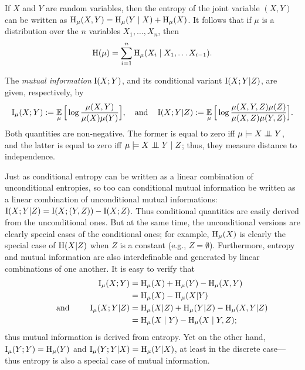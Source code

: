 \begin{fact}\label{fact:entropy-chain-rule}
    If $X$ and $Y$ are random variables, then the entropy of the joint
   variable $(X,Y)$ can be written as $\operatorname{\mathrm{H}}_\mu(X,Y) = 
\operatorname{\mathrm{H}}_\mu( Y \mid X) + \operatorname{\mathrm{H}}_\mu(X)$.
It follows that if $\mu$ is a
       distribution over the $n$ variables $X_1, \ldots, X_n$,  then
	\[ \operatorname{\mathrm{H}}(\mu) = \sum_{i = 1}^n \operatorname{\mathrm{H}}_\mu(X_i \mid X_1, \ldots X_{i-1}). \]
\end{fact}

The \emph{mutual information} $\operatorname{\mathrm{I}}(X;Y)$,
and its conditional variant $\operatorname{\mathrm{I}}(X;Y|Z)$, 
are given, respectively, by
\[
    \operatorname{\mathrm{I}}_\mu(X;Y) :=
        \operatorname*{\mathbb{E}}_{\mu} \Big[ \log \frac{\mu(X,Y)}{\mu(X) \mu(Y)}\Big],
    \quad\text{and}\quad
    \operatorname{\mathrm{I}}(X;Y|Z):= 
        \operatorname*{\mathbb{E}}_{\mu} \Big[ \log \frac{\mu(X,Y,Z)\mu(Z)}{\mu(X,Z) \mu(Y,Z)}\Big].
\]
Both quantities are non-negative.
The former is equal to zero iff $\mu \models X \mathrel{\perp\mspace{-10mu}\perp} Y$, and the latter is equal to zero iff $\mu \models X \mathrel{\perp\mspace{-10mu}\perp} Y \mid Z$;
thus, they measure distance to independence. 


Just as conditional entropy can be written as a linear combination of unconditional entropies, so too can conditional mutual information be written as a linear combination of unconditional mutual informations: $\operatorname{\mathrm{I}}(X;Y|Z) = \operatorname{\mathrm{I}}(X;(Y,Z)) - \operatorname{\mathrm{I}}(X;Z)$.  
Thus conditional quantities are easily derived from the unconditional ones. But at the same time, the unconditional versions are clearly special cases of the conditional ones; for example, $\operatorname{\mathrm{H}}_\mu(X)$ is clearly the special case of $\operatorname{\mathrm{H}}(X|Z)$ when $Z$ is a constant (e.g., $Z = \emptyset$). 
Furthermore, entropy and mutual information are also interdefinable and generated by linear combinations of one another. 
It is easy to verify that 
\begin{align*}
    \operatorname{\mathrm{I}}_\mu(X;Y) 
    &= \operatorname{\mathrm{H}}_\mu(X) + \operatorname{\mathrm{H}}_\mu(Y) - \operatorname{\mathrm{H}}_\mu(X,Y)
    \\&=  \operatorname{\mathrm{H}}_\mu(X)  - \operatorname{\mathrm{H}}_\mu(X|Y)
\\ \qquad\text{ and }\qquad
    \operatorname{\mathrm{I}}_\mu(X;Y|Z)
    &= \operatorname{\mathrm{H}}_\mu(X|Z) + \operatorname{\mathrm{H}}_\mu(Y|Z) - \operatorname{\mathrm{H}}_\mu(X,Y|Z)
    \\&= \operatorname{\mathrm{H}}_\mu(X \mid Y) - \operatorname{\mathrm{H}}_\mu(X \mid Y, Z);
\end{align*}
thus mutual information is derived from entropy. 
Yet on the other hand, $\operatorname{\mathrm{I}}_\mu(Y;Y) = \operatorname{\mathrm{H}}_\mu(Y)$ and $\operatorname{\mathrm{I}}_\mu(Y;Y|X) = \operatorname{\mathrm{H}}_\mu(Y|X)$, at least in the discrete case---thus entropy is also a special case of mutual information. 


